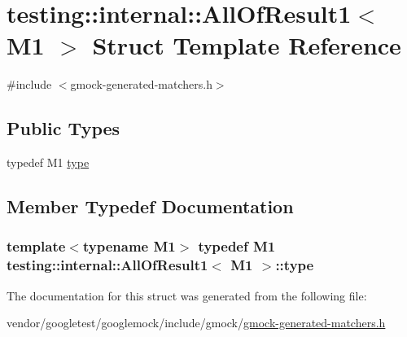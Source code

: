 \hypertarget{structtesting_1_1internal_1_1AllOfResult1}{}\section{testing\+:\+:internal\+:\+:All\+Of\+Result1$<$ M1 $>$ Struct Template Reference}
\label{structtesting_1_1internal_1_1AllOfResult1}


{\ttfamily \#include $<$gmock-\/generated-\/matchers.\+h$>$}

\subsection*{Public Types}
\begin{DoxyCompactItemize}
\item 
typedef M1 \hyperlink{structtesting_1_1internal_1_1AllOfResult1_a19b95d4ddf7f4044a78665d9e253db10}{type}
\end{DoxyCompactItemize}


\subsection{Member Typedef Documentation}
\subsubsection[{\texorpdfstring{type}{type}}]{\setlength{\rightskip}{0pt plus 5cm}template$<$typename M1$>$ typedef M1 {\bf testing\+::internal\+::\+All\+Of\+Result1}$<$ M1 $>$\+::{\bf type}}\hypertarget{structtesting_1_1internal_1_1AllOfResult1_a19b95d4ddf7f4044a78665d9e253db10}{}\label{structtesting_1_1internal_1_1AllOfResult1_a19b95d4ddf7f4044a78665d9e253db10}


The documentation for this struct was generated from the following file\+:\begin{DoxyCompactItemize}
\item 
vendor/googletest/googlemock/include/gmock/\hyperlink{gmock-generated-matchers_8h}{gmock-\/generated-\/matchers.\+h}\end{DoxyCompactItemize}
